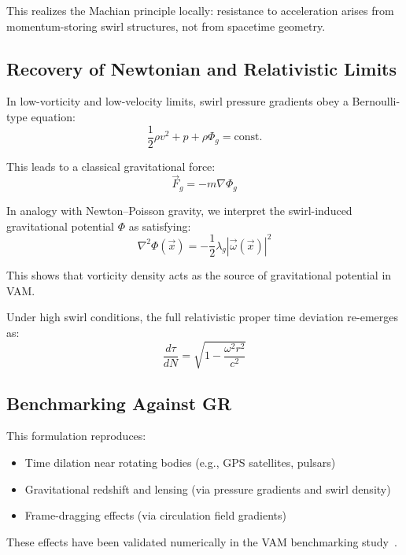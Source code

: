 \documentclass[preprint]{revtex4-2}
\begin{document}
    This realizes the Machian principle locally: resistance to acceleration arises from momentum-storing swirl structures, not from spacetime geometry.

    \subsection{Recovery of Newtonian and Relativistic Limits}
    In low-vorticity and low-velocity limits, swirl pressure gradients obey a Bernoulli-type equation:
    \begin{equation}
        \frac{1}{2} \rho v^2 + p + \rho \Phi_g = \text{const.}
        \label{eq:bernoulli_grav}
    \end{equation}

    This leads to a classical gravitational force:
    \begin{equation}
        \vec{F}_g = -m \nabla \Phi_g
        \label{eq:newtonian_grav_force}
    \end{equation}

    In analogy with Newton–Poisson gravity, we interpret the swirl-induced gravitational potential \( \Phi \) as satisfying:
    \begin{equation}
        \nabla^2 \Phi(\vec{x}) = - \frac{1}{2} \lambda_g |\vec{\omega}(\vec{x})|^2
        \label{eq:swirl_poisson}
    \end{equation}

    This shows that vorticity density acts as the source of gravitational potential in VAM.

    Under high swirl conditions, the full relativistic proper time deviation re-emerges as:
    \begin{equation}
        \frac{d\tau}{dN} = \sqrt{1 - \frac{\omega^2 r^2}{c^2}}
        \label{eq:general_swirl_time}
    \end{equation}

    \subsection{Benchmarking Against GR}
    This formulation reproduces:
    \begin{itemize}
        \item Time dilation near rotating bodies (e.g., GPS satellites, pulsars)
        \item Gravitational redshift and lensing (via pressure gradients and swirl density)
        \item Frame-dragging effects (via circulation field gradients)
    \end{itemize}
    These effects have been validated numerically in the VAM benchmarking study~\cite{vam_benchmark2025}.
\end{document}
